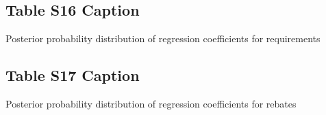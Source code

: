 \documentclass[draft]{agujournal}\usepackage{knitr}
\begin{document}
\subsection*{Table S16 Caption}
\setcounter{table}{15}%
\begin{table}[H]
\centering
\caption{Posterior probability distribution of regression coefficients for requirements}
\end{table}


\subsection*{Table S17 Caption}
\setcounter{table}{16}%
\begin{table}[H]
\centering
\caption{Posterior probability distribution of regression coefficients for rebates}
\end{table}
\end{document}
